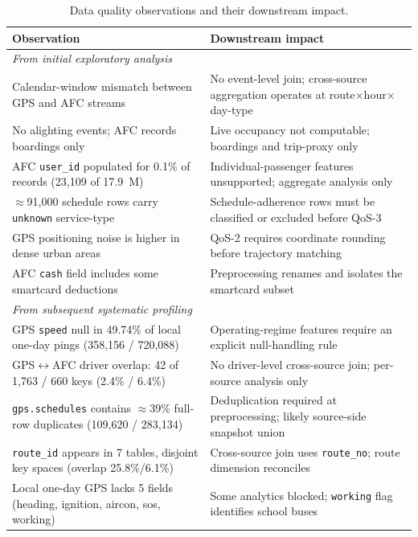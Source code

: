 \begin{table}[!htbp]
\centering
\caption{Data quality observations and their downstream impact.}
\label{tab:dataset:quality}
\footnotesize
\renewcommand{\arraystretch}{1.35}
\begin{tabularx}{\linewidth}{p{5.6cm} X}
\hline
\textbf{Observation} & \textbf{Downstream impact} \\
\hline
\multicolumn{2}{l}{\textit{From initial exploratory analysis}} \\
\hline
Calendar-window mismatch between GPS and AFC streams                          & No event-level join; cross-source aggregation operates at route$\times$hour$\times$day-type \\
No alighting events; AFC records boardings only                              & Live occupancy not computable; boardings and trip-proxy only \\
AFC \texttt{user\_id} populated for 0.1\% of records (23{,}109 of 17.9~M)    & Individual-passenger features unsupported; aggregate analysis only \\
$\approx$91{,}000 schedule rows carry \texttt{unknown} service-type           & Schedule-adherence rows must be classified or excluded before QoS-3 \\
GPS positioning noise is higher in dense urban areas                          & QoS-2 requires coordinate rounding before trajectory matching \\
AFC \texttt{cash} field includes some smartcard deductions                    & Preprocessing renames and isolates the smartcard subset \\
\hline
\multicolumn{2}{l}{\textit{From subsequent systematic profiling}} \\
\hline
GPS \texttt{speed} null in 49.74\% of local one-day pings (358{,}156 / 720{,}088) & Operating-regime features require an explicit null-handling rule \\
GPS$\leftrightarrow$AFC driver overlap: 42 of 1{,}763 / 660 keys (2.4\% / 6.4\%) & No driver-level cross-source join; per-source analysis only \\
\texttt{gps.schedules} contains $\approx$39\% full-row duplicates (109{,}620 / 283{,}134)   & Deduplication required at preprocessing; likely source-side snapshot union \\
\texttt{route\_id} appears in 7 tables, disjoint key spaces (overlap 25.8\%/6.1\%) & Cross-source join uses \texttt{route\_no}; route dimension reconciles \\
Local one-day GPS lacks 5 fields (heading, ignition, aircon, sos, working)    & Some analytics blocked; \texttt{working} flag identifies school buses \\
\hline
\end{tabularx}
\end{table}

